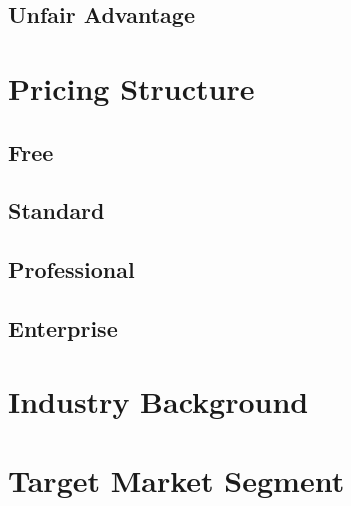 \subsection{Unfair Advantage}

\section{Pricing Structure}

\subsection{Free}

\subsection{Standard}

\subsection{Professional}

\subsection{Enterprise}

\section{Industry Background}

\section{Target Market Segment}